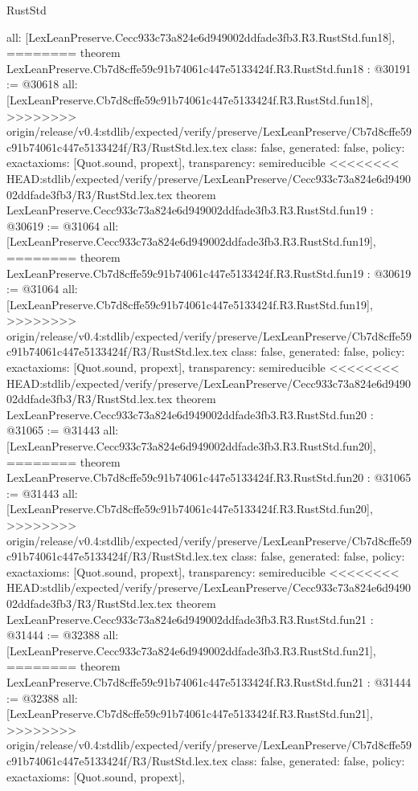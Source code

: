 \begin{lexlean}{RustStd}
\begin{coremodule}
{\begin{coremodule}
{{{{{{{{{{{{{{{{{{{{{  all: [LexLeanPreserve.Cecc933c73a824e6d949002ddfade3fb3.R3.RustStd.fun18],
========
theorem LexLeanPreserve.Cb7d8cffe59c91b74061c447e5133424f.R3.RustStd.fun18 : @30191 := @30618 {
  all: [LexLeanPreserve.Cb7d8cffe59c91b74061c447e5133424f.R3.RustStd.fun18],
>>>>>>>> origin/release/v0.4:stdlib/expected/verify/preserve/LexLeanPreserve/Cb7d8cffe59c91b74061c447e5133424f/R3/RustStd.lex.tex
  class: false,
  generated: false,
  policy: exact{axioms: [Quot.sound, propext]},
  transparency: semireducible
}
<<<<<<<< HEAD:stdlib/expected/verify/preserve/LexLeanPreserve/Cecc933c73a824e6d949002ddfade3fb3/R3/RustStd.lex.tex
theorem LexLeanPreserve.Cecc933c73a824e6d949002ddfade3fb3.R3.RustStd.fun19 : @30619 := @31064 {
  all: [LexLeanPreserve.Cecc933c73a824e6d949002ddfade3fb3.R3.RustStd.fun19],
========
theorem LexLeanPreserve.Cb7d8cffe59c91b74061c447e5133424f.R3.RustStd.fun19 : @30619 := @31064 {
  all: [LexLeanPreserve.Cb7d8cffe59c91b74061c447e5133424f.R3.RustStd.fun19],
>>>>>>>> origin/release/v0.4:stdlib/expected/verify/preserve/LexLeanPreserve/Cb7d8cffe59c91b74061c447e5133424f/R3/RustStd.lex.tex
  class: false,
  generated: false,
  policy: exact{axioms: [Quot.sound, propext]},
  transparency: semireducible
}
<<<<<<<< HEAD:stdlib/expected/verify/preserve/LexLeanPreserve/Cecc933c73a824e6d949002ddfade3fb3/R3/RustStd.lex.tex
theorem LexLeanPreserve.Cecc933c73a824e6d949002ddfade3fb3.R3.RustStd.fun20 : @31065 := @31443 {
  all: [LexLeanPreserve.Cecc933c73a824e6d949002ddfade3fb3.R3.RustStd.fun20],
========
theorem LexLeanPreserve.Cb7d8cffe59c91b74061c447e5133424f.R3.RustStd.fun20 : @31065 := @31443 {
  all: [LexLeanPreserve.Cb7d8cffe59c91b74061c447e5133424f.R3.RustStd.fun20],
>>>>>>>> origin/release/v0.4:stdlib/expected/verify/preserve/LexLeanPreserve/Cb7d8cffe59c91b74061c447e5133424f/R3/RustStd.lex.tex
  class: false,
  generated: false,
  policy: exact{axioms: [Quot.sound, propext]},
  transparency: semireducible
}
<<<<<<<< HEAD:stdlib/expected/verify/preserve/LexLeanPreserve/Cecc933c73a824e6d949002ddfade3fb3/R3/RustStd.lex.tex
theorem LexLeanPreserve.Cecc933c73a824e6d949002ddfade3fb3.R3.RustStd.fun21 : @31444 := @32388 {
  all: [LexLeanPreserve.Cecc933c73a824e6d949002ddfade3fb3.R3.RustStd.fun21],
========
theorem LexLeanPreserve.Cb7d8cffe59c91b74061c447e5133424f.R3.RustStd.fun21 : @31444 := @32388 {
  all: [LexLeanPreserve.Cb7d8cffe59c91b74061c447e5133424f.R3.RustStd.fun21],
>>>>>>>> origin/release/v0.4:stdlib/expected/verify/preserve/LexLeanPreserve/Cb7d8cffe59c91b74061c447e5133424f/R3/RustStd.lex.tex
  class: false,
  generated: false,
  policy: exact{axioms: [Quot.sound, propext]},
}}}}}}}}}}}}}}}}}}}}}}}}}
\end{coremodule}}
\end{coremodule}
\end{lexlean}
